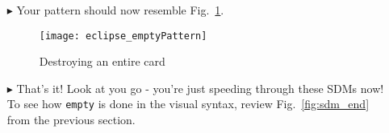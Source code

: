 \begin{itemize}
\vspace{0.5cm}

\item[$\blacktriangleright$] Your pattern should now resemble Fig.~\ref{fig:emptyPattern}.

\vspace{0.5cm}

\begin{figure}[htpb]
\begin{center}
  \texttt{[image: eclipse\_emptyPattern]}
  \caption{Destroying an entire card}
  \label{fig:emptyPattern}
\end{center}
\end{figure}

\item[$\blacktriangleright$] That's it! Look at you go - you're just speeding through these SDMs now! To see how \texttt{empty} is done in the visual syntax,
review Fig.~\ref{fig:sdm_end} from the previous section.

\end{itemize}

